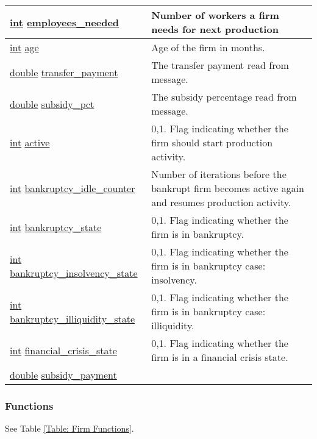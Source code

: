 \documentclass[a4paper,11pt]{article}
\begin{document}
\begin{landscape}
\begin{longtable}[H!]{ll}
\midrule
\url{int} \url{employees_needed} & \parbox{10cm}{Number of workers a firm needs for next production} \\
\midrule
\url{int} \url{age} & \parbox{10cm}{Age of the firm in months.} \\
\midrule
\url{double} \url{transfer_payment} & \parbox{10cm}{The transfer payment read from message.} \\
\midrule
\url{double} \url{subsidy_pct} & \parbox{10cm}{The subsidy percentage read from message.} \\
\midrule
\url{int} \url{active} & \parbox{10cm}{0,1. Flag indicating whether the firm should start production activity.} \\
\midrule
\url{int} \url{bankruptcy_idle_counter} & \parbox{10cm}{Number of iterations before the bankrupt firm becomes active again and resumes production activity.} \\
\midrule
\url{int} \url{bankruptcy_state} & \parbox{10cm}{0,1. Flag indicating whether the firm is in bankruptcy.} \\
\midrule
\url{int} \url{bankruptcy_insolvency_state} & \parbox{10cm}{0,1. Flag indicating whether the firm is in bankruptcy case: insolvency.} \\
\midrule
\url{int} \url{bankruptcy_illiquidity_state} & \parbox{10cm}{0,1. Flag indicating whether the firm is in bankruptcy case: illiquidity.} \\
\midrule
\url{int} \url{financial_crisis_state} & \parbox{10cm}{0,1. Flag indicating whether the firm is in a financial crisis state.} \\
\midrule
\url{double} \url{subsidy_payment} & \parbox{10cm}{} \\
\end{longtable}
\end{landscape}

\subsubsection{Functions}
See Table \ref{Table: Firm Functions}.
\end{document}
